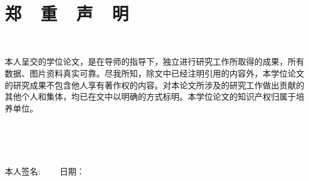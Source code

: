 \hspace*{\fill} \\

\section*{\textbf{\songti{} 郑\ \ 重\ \ 声\ \ 明}}

\thispagestyle{fancy}
\lhead{}
\rhead{}
\fancyfoot{}


\hspace*{\fill} \\

{\songti 本人呈交的学位论文，是在导师的指导下，独立进行研究工作所取得的成果，所有数据、图片资料真实可靠。尽我所知，除文中已经注明引用的内容外，本学位论文的研究成果不包含他人享有著作权的内容。对本论文所涉及的研究工作做出贡献的其他个人和集体，均已在文中以明确的方式标明。本学位论文的知识产权归属于培养单位。\par
 \hspace*{\fill} \\
 \hspace*{\fill} \\
 \hspace*{\fill} \\
 \hspace*{\fill} \par
本人签名: \makebox[3cm]{           }\ \ \ \  日期：
}
\cleardoublepage



